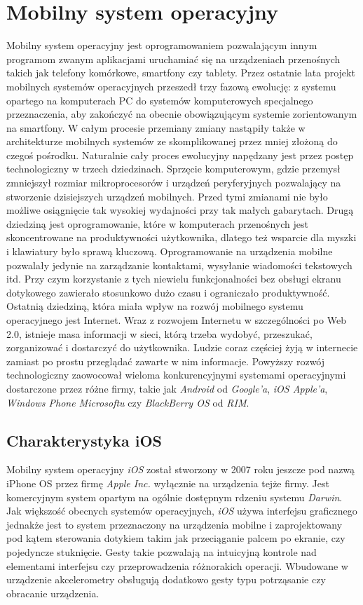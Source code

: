 \documentclass{iiuwb}
\begin{document}
\section{Mobilny system operacyjny}
Mobilny system operacyjny jest oprogramowaniem pozwalającym innym programom zwanym aplikacjami uruchamiać się na urządzeniach przenośnych takich jak telefony komórkowe, smartfony czy tablety. Przez ostatnie lata projekt mobilnych systemów operacyjnych przeszedł trzy fazową ewolucję:  z systemu opartego na komputerach PC do systemów komputerowych specjalnego przeznaczenia, aby zakończyć na obecnie  obowiązującym systemie zorientowanym na smartfony. W całym procesie przemiany zmiany nastąpiły także w architekturze mobilnych systemów ze skomplikowanej przez mniej złożoną do czegoś pośrodku. Naturalnie cały proces ewolucyjny napędzany jest przez postęp technologiczny w trzech dziedzinach. Sprzęcie komputerowym, gdzie przemysł zmniejszył rozmiar mikroprocesorów i urządzeń peryferyjnych pozwalający na stworzenie dzisiejszych urządzeń mobilnych. Przed tymi zmianami nie było możliwe osiągnięcie tak wysokiej wydajności przy tak małych gabarytach. Drugą dziedziną jest oprogramowanie, które w komputerach przenośnych jest skoncentrowane na produktywności użytkownika, dlatego też wsparcie dla myszki i klawiatury było sprawą kluczową. Oprogramowanie na urządzenia mobilne pozwalały jedynie na zarządzanie kontaktami, wysyłanie wiadomości tekstowych itd. Przy czym korzystanie z tych niewielu funkcjonalności bez obsługi ekranu dotykowego zawierało stosunkowo dużo czasu i ograniczało produktywność. Ostatnią dziedziną, która miała wpływ na rozwój mobilnego systemu operacyjnego jest Internet. Wraz z rozwojem Internetu w szczególności po Web 2.0, istnieje masa informacji w sieci, którą trzeba wydobyć, przeszukać, zorganizować i dostarczyć do użytkownika. Ludzie coraz częściej żyją w internecie zamiast po prostu przeglądać zawarte w nim informacje.
Powyższy rozwój technologiczny zaowocował wieloma konkurencyjnymi systemami operacyjnymi dostarczone przez różne firmy, takie jak \textit{Android} od \textit{Google'a}, \textit{iOS Apple'a}, \textit{Windows Phone Microsoftu} czy \textit{BlackBerry OS} od \textit{RIM}.

\subsection{Charakterystyka iOS}
Mobilny system operacyjny \textit{iOS} został stworzony w 2007 roku jeszcze pod nazwą iPhone OS przez firmę \textit{Apple Inc.} wyłącznie na urządzenia tejże firmy. Jest komercyjnym system opartym na ogólnie dostępnym rdzeniu systemu \textit{Darwin}. Jak większość obecnych systemów operacyjnych, \textit{iOS} używa interfejsu graficznego jednakże jest to system przeznaczony na urządzenia mobilne i zaprojektowany pod kątem sterowania dotykiem takim jak przeciąganie palcem po ekranie, czy pojedyncze stuknięcie. Gesty takie pozwalają na intuicyjną kontrole nad elementami interfejsu czy przeprowadzenia różnorakich operacji. Wbudowane w urządzenie akcelerometry obsługują dodatkowo gesty typu potrząsanie czy obracanie urządzenia.
\end{document}
